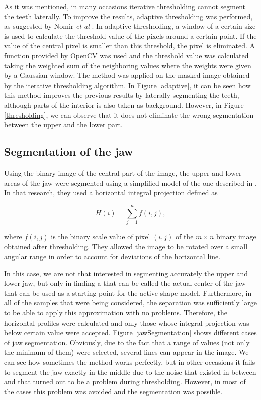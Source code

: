 \documentclass[a4paper,11pt,twoside]{article}
\begin{document}
As it was mentioned, in many occasions iterative thresholding cannot segment the teeth laterally. To improve the results, adaptive thresholding was performed, as suggested by Nomir \textit{et al} \cite{nomir}. In adaptive thresholding, a window of a certain size is used to calculate the threshold value of the pixels around a certain point. If the value of the central pixel is smaller than this threshold, the pixel is eliminated. A function provided by OpenCV was used and the threshold value was calculated taking the weighted sum of the neighboring values where the weights were given by a Gaussian window. The method was applied on the masked image obtained by the iterative thresholding algorithm. In Figure \ref{adaptive}, it can be seen how this method improves the previous results by laterally segmenting the teeth, although parts of the interior is also taken as background. However, in Figure \ref{thresholding}, we can observe that it does not eliminate the wrong segmentation between the upper and the lower part. 



\subsection{Segmentation of the jaw}\label{centralSegmentation}

Using the binary image of the central part of the image, the upper and lower areas of the jaw were segmented using a simplified model of the one described in \cite{nomir}. In that research, they used a horizontal integral projection defined as

\begin{equation}
H(i)=\sum\limits_{j=1}^n f(i,j),
\end{equation}

\noindent
where $f(i,j)$ is the binary scale value of pixel $(i,j)$ of the $m \times n$ binary image obtained after thresholding. They allowed the image to be rotated over a small angular range in order to account for deviations of the horizontal line.

In this case, we are not that interested in segmenting accurately the upper and lower jaw, but only in finding a that can be called the actual center of the jaw that can be used as a starting point for the active shape model. Furthermore, in all of the samples that were being considered, the separation was sufficiently large to be able to apply this approximation with no problems. Therefore, the horizontal profiles were calculated and only those whose integral projection was below certain value were accepted. Figure \ref{jawSegmentation} shows different cases of jaw segmentation. Obviously, due to the fact that a range of values (not only the minimum of them) were selected, several lines can appear in the image. We can see how sometimes the method works perfectly, but in other occasions it fails to segment the jaw exactly in the middle due to the noise that existed in between and that turned out to be a problem during thresholding. However, in most of the cases this problem was avoided and the segmentation was possible.
\end{document}
